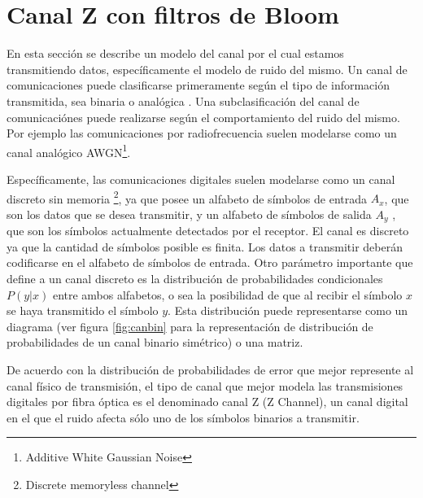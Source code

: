 % 

\section{Canal Z con filtros de Bloom}

En esta sección se describe un modelo del canal por el cual estamos transmitiendo datos, específicamente el modelo de ruido del mismo. 
Un canal de comunicaciones puede clasificarse primeramente según el tipo de información transmitida, sea binaria o analógica \cite{MacKay:2002}.
Una subclasificación del canal de comunicaciónes puede realizarse según el comportamiento del ruido del mismo.
Por ejemplo las comunicaciones por radiofrecuencia suelen modelarse como un canal analógico AWGN\footnote{Additive White Gaussian Noise}. 

Específicamente, las comunicaciones digitales suelen modelarse como un canal discreto sin memoria \footnote{Discrete memoryless channel}, ya que posee un alfabeto de símbolos de entrada $A_{x}$, que son los datos que se desea transmitir, y un alfabeto de símbolos de salida $A_{y}$ , que son los símbolos actualmente detectados por el receptor. El canal es discreto ya que la cantidad de símbolos posible es finita. Los datos a transmitir deberán codificarse en el alfabeto de símbolos de entrada.
Otro parámetro importante que define a un canal discreto es la distribución de probabilidades condicionales $P(y|x)$ entre ambos alfabetos, o sea la posibilidad de que al recibir el símbolo $x$ se haya transmitido el símbolo $y$. Esta distribución puede representarse como un diagrama (ver figura \ref{fig:canbin} para la representación de distribución de probabilidades de un canal binario simétrico) o una matriz.

De acuerdo con la distribución de probabilidades de error que mejor represente al canal físico de transmisión, el tipo de canal que mejor modela las transmisiones digitales por fibra óptica es el denominado canal Z (Z Channel), un canal digital en el que el ruido afecta sólo uno de los símbolos binarios a transmitir.


